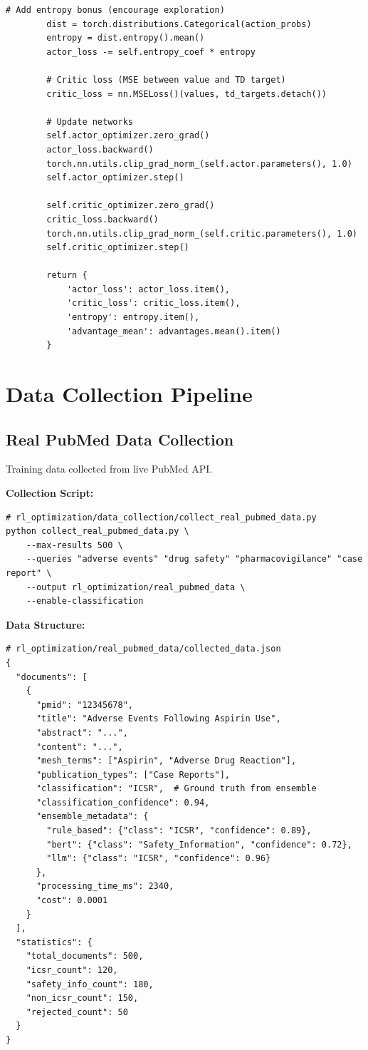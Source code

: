 \begin{lstlisting}[style=pythonstyle]
        # Add entropy bonus (encourage exploration)
        dist = torch.distributions.Categorical(action_probs)
        entropy = dist.entropy().mean()
        actor_loss -= self.entropy_coef * entropy
        
        # Critic loss (MSE between value and TD target)
        critic_loss = nn.MSELoss()(values, td_targets.detach())
        
        # Update networks
        self.actor_optimizer.zero_grad()
        actor_loss.backward()
        torch.nn.utils.clip_grad_norm_(self.actor.parameters(), 1.0)
        self.actor_optimizer.step()
        
        self.critic_optimizer.zero_grad()
        critic_loss.backward()
        torch.nn.utils.clip_grad_norm_(self.critic.parameters(), 1.0)
        self.critic_optimizer.step()
        
        return {
            'actor_loss': actor_loss.item(),
            'critic_loss': critic_loss.item(),
            'entropy': entropy.item(),
            'advantage_mean': advantages.mean().item()
        }
\end{lstlisting}

\section{Data Collection Pipeline}

\subsection{Real PubMed Data Collection}

Training data collected from live PubMed API.

\textbf{Collection Script:}
\begin{lstlisting}[style=bashstyle]
# rl_optimization/data_collection/collect_real_pubmed_data.py
python collect_real_pubmed_data.py \
    --max-results 500 \
    --queries "adverse events" "drug safety" "pharmacovigilance" "case report" \
    --output rl_optimization/real_pubmed_data \
    --enable-classification
\end{lstlisting}

\textbf{Data Structure:}
\begin{lstlisting}[style=pythonstyle]
# rl_optimization/real_pubmed_data/collected_data.json
{
  "documents": [
    {
      "pmid": "12345678",
      "title": "Adverse Events Following Aspirin Use",
      "abstract": "...",
      "content": "...",
      "mesh_terms": ["Aspirin", "Adverse Drug Reaction"],
      "publication_types": ["Case Reports"],
      "classification": "ICSR",  # Ground truth from ensemble
      "classification_confidence": 0.94,
      "ensemble_metadata": {
        "rule_based": {"class": "ICSR", "confidence": 0.89},
        "bert": {"class": "Safety_Information", "confidence": 0.72},
        "llm": {"class": "ICSR", "confidence": 0.96}
      },
      "processing_time_ms": 2340,
      "cost": 0.0001
    }
  ],
  "statistics": {
    "total_documents": 500,
    "icsr_count": 120,
    "safety_info_count": 180,
    "non_icsr_count": 150,
    "rejected_count": 50
  }
}
\end{lstlisting}

